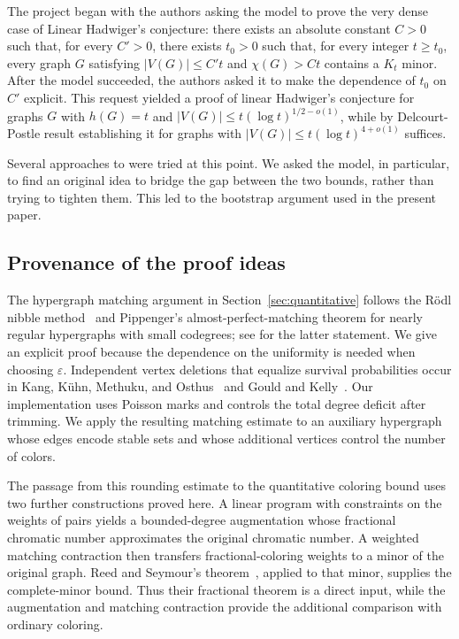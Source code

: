\documentclass[11pt]{article}
\begin{document}
The project began with the authors asking the model to prove the very dense case of Linear Hadwiger’s conjecture: there exists an absolute constant $C>0$ such that, for every $C'>0$, there exists $t_0>0$ such that, for every integer $t\ge t_0$, every graph $G$ satisfying
$
|V(G)|\le C't$ and
$
\chi(G)>Ct
$
contains a $K_t$ minor. After the model succeeded, the authors asked it to make the dependence of $t_0$ on $C'$ explicit.
This request yielded a proof of linear Hadwiger's conjecture for graphs $G$ with $h(G)=t$ and $|V(G)| \leq t( \log t )^{1/2-o(1)}$, while by Delcourt-Postle result establishing it for graphs with $|V(G)| \leq t (\log t)^{4+o(1)}$ suffices. 

Several approaches to  were tried at this point. We asked the model, in particular,  to find an original idea to bridge the gap between the two bounds, rather than trying to tighten them. This led to the bootstrap argument used in the present paper.


\subsection{Provenance of the proof ideas}

The hypergraph matching argument in Section~\ref{sec:quantitative} follows the
R\"odl nibble method~\cite{Rodl} and Pippenger's almost-perfect-matching
theorem for nearly regular hypergraphs with small codegrees; see
\cite[Theorem~1.1]{EGJ} for the latter statement. We give an explicit
proof because the dependence on the uniformity is needed when
choosing $\varepsilon$. Independent vertex deletions that equalize
survival probabilities occur in Kang, K\"uhn, Methuku, and
Osthus~\cite[Section~5.1]{KKMO} and Gould and
Kelly~\cite[Section~6.1]{GK}. Our implementation uses Poisson marks
and controls the total degree deficit after trimming. We apply the
resulting matching estimate to an auxiliary hypergraph whose edges
encode stable sets and whose additional vertices control the number
of colors.

The passage from this rounding estimate to the quantitative coloring
bound uses two further constructions proved here. A linear program
with constraints on the weights of pairs yields a bounded-degree
augmentation whose fractional chromatic number approximates the
original chromatic number. A weighted matching contraction then
transfers fractional-coloring weights to a minor of the original
graph. Reed and Seymour's theorem~\cite[Theorem~1.3]{RS}, applied
to that minor, supplies the complete-minor bound. Thus their
fractional theorem is a direct input, while the augmentation and
matching contraction provide the additional comparison with ordinary
coloring.
\end{document}
